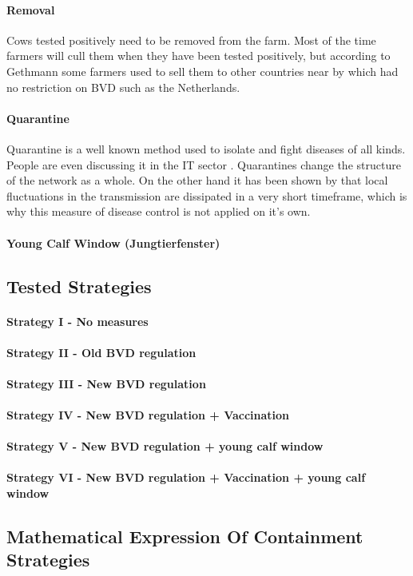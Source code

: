 \paragraph{Removal}
Cows tested positively need to be removed from the farm. Most of the time farmers will cull them when they have been tested positively, but according to Gethmann some farmers used to sell them to other countries near by which had no restriction on BVD such as the Netherlands.

\paragraph{Quarantine}
Quarantine is a well known method used to isolate and fight diseases of all kinds. People are even discussing it in the IT sector \citep{moore2003internet}. Quarantines change the structure of the network as a whole. On the other hand it has been shown by \citep{Keeling20051} that local fluctuations in the transmission are dissipated in a very short timeframe, which is why this measure of disease control is not applied on it's own.

\paragraph{Young Calf Window (Jungtierfenster)}
\subsection{Tested Strategies}
\paragraph{Strategy I - No measures}
\paragraph{Strategy II - Old BVD regulation}
\paragraph{Strategy III - New BVD regulation}
\paragraph{Strategy IV - New BVD regulation + Vaccination}
\paragraph{Strategy V - New BVD regulation + young calf window}
\paragraph{Strategy VI - New BVD regulation + Vaccination + young calf window} 
\subsection{Mathematical Expression Of Containment Strategies}